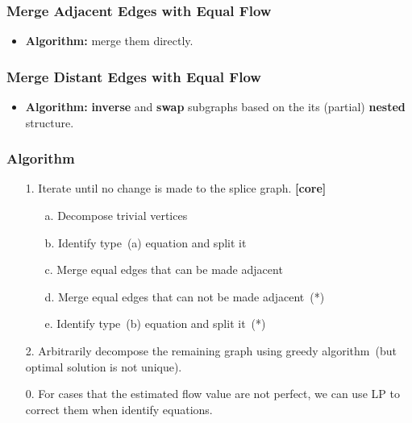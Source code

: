 \frame
{
	\frametitle{Merge Adjacent Edges with Equal Flow}
	\vspace{-2.0cm}

	\begin{itemize}
	\item {\bf Algorithm:} merge them directly.
	\end{itemize}

	\vspace{0.8cm}
	

}


\frame
{
	\frametitle{Merge Distant Edges with Equal Flow}
	\vspace{-3.0cm}

	\begin{itemize}
	\item {\bf Algorithm:} {\bf inverse} and {\bf swap} subgraphs based on the its (partial) {\bf nested} structure.
	\end{itemize}

	\vspace{0.8cm}
	

}

\frame
{
	\frametitle{Algorithm}
	\begin{itemize}
	\item[1.] Iterate until no change is made to the splice graph. {\bf [core]}
		\vspace{0.2cm}
		\begin{itemize}
		\item[a.] Decompose trivial vertices
		\vspace{0.2cm}
		\item[b.] Identify type~(a) equation and split it
		\vspace{0.2cm}
		\item[c.] Merge equal edges that can be made adjacent
		\vspace{0.2cm}
		\item[d.] Merge equal edges that can not be made adjacent~(*)
		\vspace{0.2cm}
		\item[e.] Identify type~(b) equation and split it~(*)
		\vspace{0.2cm}
		\end{itemize}
	\item[2.] Arbitrarily decompose the remaining graph using greedy
		algorithm~(but optimal solution is not unique).

	\vspace{0.2cm}
	\item[0.] For cases that the estimated flow value are not perfect, 
		we can use LP to correct them when identify equations.
	\end{itemize}
}

